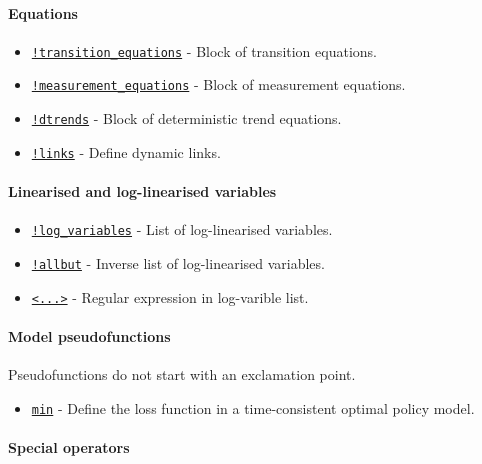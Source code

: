  \paragraph{Equations}
 
 \begin{itemize}
 \item
   \href{modellang/transitionequations}{\texttt{!transition\_equations}}
   - Block of transition equations.
 \item
   \href{modellang/measurementequations}{\texttt{!measurement\_equations}}
   - Block of measurement equations.
 \item
   \href{modellang/dtrends}{\texttt{!dtrends}} - Block of deterministic
   trend equations.
 \item
   \href{modellang/links}{\texttt{!links}} - Define dynamic links.
 \end{itemize}
 
 \paragraph{Linearised and log-linearised variables}
 
 \begin{itemize}
 \item
   \href{modellang/logvariables}{\texttt{!log\_variables}} - List of
   log-linearised variables.
 \item
   \href{modellang/allbut}{\texttt{!allbut}} - Inverse list of
   log-linearised variables.
 \item
   \href{modellang/regexpression}{\texttt{\textless{}...\textgreater{}}}
   - Regular expression in log-varible list.
 \end{itemize}
 
 \paragraph{Model pseudofunctions}
 
 Pseudofunctions do not start with an exclamation point.
 
 \begin{itemize}
 \item
   \href{modellang/min}{\texttt{min}} - Define the loss function in a
   time-consistent optimal policy model.
 \end{itemize}
 
 \paragraph{Special operators}
 
